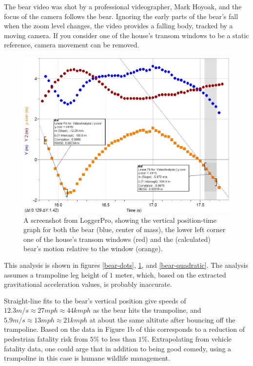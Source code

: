 \documentclass[prb,twocolumn]{revtex4-2}
\begin{document}
The bear video was shot by a professional videographer, Mark Hoyoak, and the focus of the camera follows the bear.  Ignoring the early parts of the bear's fall when the zoom level changes, the video provides a falling body, tracked by a moving camera.  If you consider one of the house's transom windows to be a static reference, camera movement can be removed.

\begin{figure}[h]
\centering
\includegraphics[width=\columnwidth]{bear-speed.jpg}
\caption{
A screenshot from LoggerPro, showing the vertical position-time graph for both the bear (blue, center of mass), the lower left corner one of the house's transom windows (red) and the (calculated) bear's motion relative to the window (orange). 
}
\label{bear-speed}
\end{figure}

This analysis is shown in figures \ref{bear-dots}, \ref{bear-speed}, and \ref{bear-quadratic}.
 The analysis assumes a trampoline leg height of $1$ meter, which, based on the extracted gravitational acceleration values, is probably inaccurate.
 
 Straight-line fits to the bear's vertical position give speeds of $12.3m/s\approx27mph\approx44kmph$ as the bear hits the trampoline, and $5.9m/s\approx13mph\approx21kmph$ at about the same altitute after bouncing off the trampoline.  Based on the data in Figure 1b of \cite{AccidentRisk} this corresponds to a reduction of pedestrian fatality risk from $5\%$ to less than $1\%$.  Extrapolating from vehicle fatality data, one could arge that in addition to being good comedy, using a trampoline in this case is humane wildlife management.     
     
\end{document}
